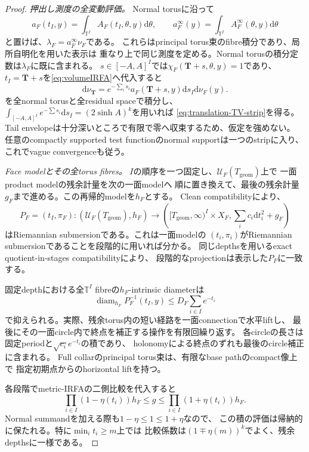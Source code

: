 \documentclass[11pt,a4paper]{ltjsarticle}
\newcommand{\dd}{\mathrm d}
\theoremstyle{plain}
\theoremstyle{definition}
\theoremstyle{remark}
\begin{document}
\begin{proof}
\emph{押出し測度の全変動評価。}
Normal torusに沿って
\[
 a_F(t_I,y)=\int_{\mathbb T^I}A_F(t_I,\theta,y)\dd\theta,
 \qquad
 a_F^\infty(y)=\int_{\mathbb T^I}A_F^\infty(\theta,y)\dd\theta
\]
と置けば、$\lambda_F=a_F^\infty\nu_F$である。
これらはprincipal torus束のfibre積分であり、局所自明化を用いた表示は
重なり上で同じ測度を定める。Normal torusの積分定数は$\lambda_F$に既に含まれる。
$s\in[-A,A]^I$では$\chi_F(\bm T+s,\theta,y)=1$であり、
$t_I=\bm T+s$を\eqref{eq:volumeIRFA}へ代入すると
\[
 \dd\nu_{\bm T}
 =e^{-\sum_i s_i}a_F(\bm T+s,y)\dd s_I\dd\nu_F(y).
\]
を全normal torusと全residual spaceで積分し、
$\int_{[-A,A]^I}e^{-\sum s_i}\dd s_I=(2\sinh A)^k$を用いれば
\eqref{eq:translation-TV-strip}を得る。
Tail envelopeは十分深いところで有限で零へ収束するため、仮定を強めない。
任意のcompactly supported test functionのnormal supportは一つのstripに入り、
これでvague convergenceも従う。

\emph{Face modelとその全torus fibres。}
$I$の順序を一つ固定し、$\mathcal U_F(T_{\mathrm{geom}})$上で
一面product modelの残余計量を次の一面modelへ
順に置き換えて、最後の残余計量$g_F$まで進める。この再帰的modelを$h_F$とする。
Clean compatibilityにより、
\[
 P_F=(t_I,\pi_F): (\mathcal U_F(T_{\mathrm{geom}}),h_F)
 \longrightarrow
 \left([T_{\mathrm{geom}},\infty)^I\times X_F,
       \sum_i c_i\dd t_i^2+g_F\right)
\]
はRiemannian submersionである。これは一面modelの
$(t_i,\pi_i)$がRiemannian submersionであることを段階的に用いれば分かる。
同じdepthsを用いるexact quotient-in-stages compatibilityにより、
段階的なprojectionは表示した$P_F$に一致する。

固定depthにおける全$\mathbb T^I$ fibreの$h_F$-intrinsic diameterは
\begin{equation}
\label{eq:translation-torus-diameter}
 \operatorname{diam}_{h_F}P_F^{-1}(t_I,y)
 \le D_F\sum_{i\in I}e^{-t_i}
\end{equation}
で抑えられる。実際、残余torus内の短い経路を一面connectionで水平liftし、
最後にその一面circle内で終点を補正する操作を有限回繰り返す。
各circleの長さは固定periodと$\sqrt{c_i}e^{-t_i}$の積であり、
holonomyによる終点のずれも最後のcircle補正に含まれる。
Full collarのprincipal torus束は、有限なbase pathのcompact像上で
指定初期点からのhorizontal liftを持つ。

各段階でmetric-IRFAの二側比較を代入すると
\begin{equation}
\label{eq:translation-face-model}
 \prod_{i\in I}(1-\eta(t_i))h_F
 \le g\le
 \prod_{i\in I}(1+\eta(t_i))h_F.
\end{equation}
Normal summandを加える際も$1-\eta\le1\le1+\eta$なので、
この積の評価は帰納的に保たれる。特に$\min_i t_i\ge m$上では
比較係数は$(1\mp\eta(m))^k$でよく、残余depthsに一様である。


\end{proof}
\end{document}
